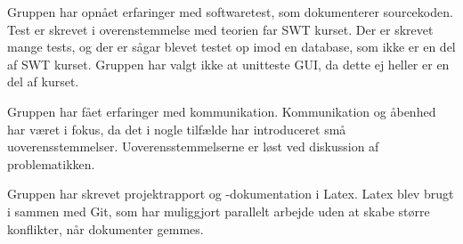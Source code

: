 Gruppen har opnået erfaringer med softwaretest,  som dokumenterer sourcekoden. Test er skrevet i overenstemmelse med teorien far SWT kurset. Der er skrevet mange tests, og der er sågar blevet testet op imod en database, som ikke er en del af SWT kurset. Gruppen har valgt ikke at unitteste GUI, da dette ej heller er en del af kurset. 

Gruppen har fået erfaringer med kommunikation. Kommunikation og åbenhed har været i fokus, da det i nogle tilfælde har introduceret små uoverensstemmelser. Uoverensstemmelserne er løst ved diskussion af problematikken.

Gruppen har skrevet projektrapport og -dokumentation i Latex. Latex blev brugt i sammen med Git, som har muliggjort parallelt arbejde uden at skabe større konflikter, når dokumenter gemmes. 